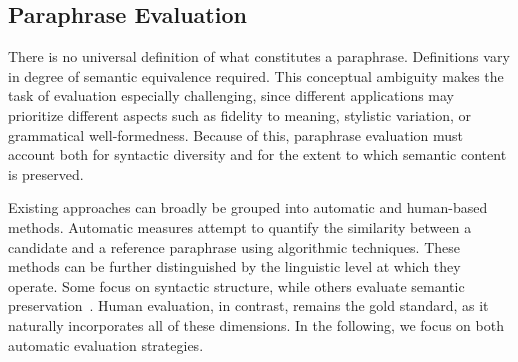 
\subsection{Paraphrase Evaluation}
\label{subsec:paraphrase_evaluation}

There is no universal definition of what constitutes a paraphrase. 
Definitions vary in degree of semantic equivalence required. 
This conceptual ambiguity makes the task of evaluation especially challenging, since different applications may prioritize different aspects such as fidelity to meaning, stylistic variation, or grammatical well-formedness.
Because of this, paraphrase evaluation must account both for syntactic diversity and for the extent to which semantic content is preserved. 

Existing approaches can broadly be grouped into automatic and human-based methods. 
Automatic measures attempt to quantify the similarity between a candidate and a reference paraphrase using algorithmic techniques. 
These methods can be further distinguished by the linguistic level at which they operate. 
Some focus on syntactic structure, while others evaluate semantic preservation~\citep{gohsen_captions_2023}. 
Human evaluation, in contrast, remains the gold standard, as it naturally incorporates all of these dimensions.
In the following, we focus on both automatic evaluation strategies. 






